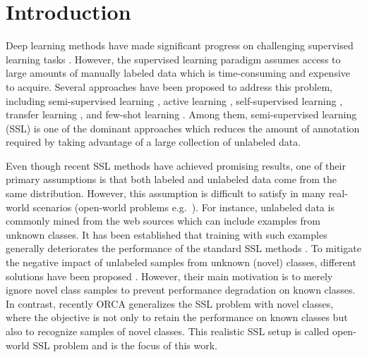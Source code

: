 \documentclass[runningheads]{eccv2022submission}
\begin{document}
\section{Introduction}

Deep learning methods have made significant progress on challenging  supervised learning tasks \cite{he2016deep,szegedy2016rethinking,he2017mask,carreira2017quo,chen2018encoder}. However, the supervised learning paradigm assumes access to large amounts of manually labeled data which is time-consuming and expensive to acquire. Several approaches have been proposed to address this problem, including semi-supervised learning \cite{tarvainen2017mean,miyato2018virtual,NIPS2019_8749_MixMatch}, active learning \cite{NIPS2017_8ca8da41,gal2017deep,sener2018active}, self-supervised learning \cite{doersch2015unsupervised,chen2020simple,he2020momentum}, transfer learning \cite{sharif2014cnn,zamir2018taskonomy,kornblith2019better}, and few-shot learning \cite{pmlr-v70-finn17a,NIPS2016_6385,snell2017prototypical,rizve2021exploring}. Among them, semi-supervised learning (SSL) is one of the dominant approaches which reduces the amount of annotation required by taking advantage of a large collection of unlabeled data.


Even though recent SSL methods \cite{NIPS2019_8749_MixMatch,Berthelot2020ReMixMatch:,FixMatch,xie2019unsupervised} have achieved promising results, one of their primary assumptions is that both labeled and unlabeled data come from the same distribution. However, this assumption is difficult to satisfy in many real-world scenarios (open-world problems e.g.\  \cite{bendale2015towards,kardan2017mitigating}). For instance, unlabeled data is commonly mined from the web sources which can include examples from unknown classes. It has been established that training with such examples generally deteriorates the performance of the standard SSL methods \cite{oliver2018realistic,chen2020semi} . To mitigate the negative impact of unlabeled samples from unknown (novel) classes, different solutions have been proposed \cite{guo2020safe,chen2020semi,zhao2020robust}. However, their main motivation is to merely ignore novel class samples to prevent performance degradation on known classes. In contrast, recently ORCA \cite{cao2022openworld} generalizes the SSL problem with novel classes, where the objective is not only to retain the performance on known classes but also to recognize samples of novel classes. This realistic SSL setup is called open-world SSL problem and is the focus of this work.
\end{document}
